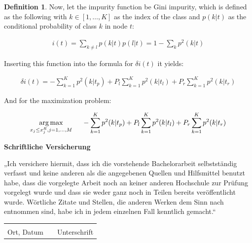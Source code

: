 \documentclass[12pt, a4paper, abstract, parskip]{scrartcl}
\theoremstyle{definition}
\newtheorem{definition}{Definition}[subsection]
\begin{document}
\begin{definition}
Now, let the impurity function be Gini impurity, which is defined as the
following with $k\in[1,\dots,K]$ as the index of the class and $p(k|t)$ as the
conditional probability of class $k$ in node $t$:

\begin{align*}
i(t) = \sum_{k\neq l} p(k|t) p(l|t) = 1-\sum_kp^2(k|t)
\end{align*}

Inserting this function into the formula for $\delta i(t)$ it yields:

\begin{align*}
\delta i(t) = -\sum^K_{k=1}p^2(k|t_p) + P_l\sum^K_{k=1}p^2(k|t_l) + P_r\sum^K_{k=1}p^2(k|t_r)
\end{align*}

And for the maximization problem:

\begin{align*}
\underset{x_j\leq x^R_j,j=1,\dots,M}{\arg\max}\hspace{5mm} -\sum^K_{k=1}p^2(k|t_p) + P_l\sum^K_{k=1}p^2(k|t_l) + P_r\sum^K_{k=1}p^2(k|t_r)
\end{align*}
\label{def:giniimpurity}
\end{definition}

\newpage

\printbibliography

\newpage

\vspace*{5cm}

\textbf{\Large Schriftliche Versicherung}\vspace{3cm}

„Ich versichere hiermit, dass ich die vorstehende Bachelorarbeit selbstständig
verfasst und keine anderen als die angegebenen Quellen und Hilfsmittel benutzt
habe, dass die vorgelegte Arbeit noch an keiner anderen Hochschule zur Prüfung
vorgelegt wurde und dass sie weder ganz noch in Teilen bereits veröffentlicht
wurde. Wörtliche Zitate und Stellen, die anderen Werken dem Sinn nach entnommen
sind, habe ich in jedem einzelnen Fall kenntlich gemacht.“

\vspace{3cm}

\begin{tabular}{p{4cm}p{4cm}p{4cm}} \\
&  & \\ \cline{1-1} \cline{3-3}
\footnotesize{Ort, Datum} & & \footnotesize{Unterschrift}\\
\end{tabular}
\end{document}
